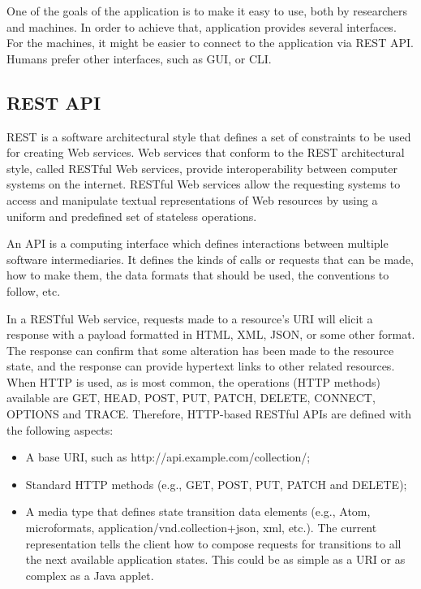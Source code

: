 \documentclass[thesis=M,english,hidelinks]{FITthesis}[2019/12/23]
\begin{document}
One of the goals of the application is to make it easy to use, both by researchers and machines. In order to achieve that, application provides several interfaces. For the machines, it might be easier to connect to the application via \gls{REST} \gls{API}. Humans prefer other interfaces, such as \gls{GUI}, or \gls{CLI}.

\subsection{REST API}

\gls{REST} is a software architectural style that defines a set of constraints to be used for creating Web services. Web services that conform to the REST architectural style, called RESTful Web services, provide interoperability between computer systems on the internet. RESTful Web services allow the requesting systems to access and manipulate textual representations of Web resources by using a uniform and predefined set of stateless operations.

An \gls{API} is a computing interface which defines interactions between multiple software intermediaries. It defines the kinds of calls or requests that can be made, how to make them, the data formats that should be used, the conventions to follow, etc.

In a RESTful Web service, requests made to a resource's URI will elicit a response with a payload formatted in HTML, XML, JSON, or some other format. The response can confirm that some alteration has been made to the resource state, and the response can provide hypertext links to other related resources. When HTTP is used, as is most common, the operations (HTTP methods) available are GET, HEAD, POST, PUT, PATCH, DELETE, CONNECT, OPTIONS and TRACE. Therefore, HTTP-based RESTful APIs are defined with the following aspects:

\begin{itemize}
	\item A base URI, such as http://api.example.com/collection/;
	\item Standard HTTP methods (e.g., GET, POST, PUT, PATCH and DELETE);
	\item A media type that defines state transition data elements (e.g., Atom, microformats, application/vnd.collection+json, xml, etc.). The current representation tells the client how to compose requests for transitions to all the next available application states. This could be as simple as a URI or as complex as a Java applet.
\end{itemize}
\end{document}
